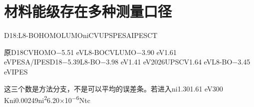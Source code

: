 \section{{\cjkfont 材料能级存在多种测量口径}\allowbreak{}}\label{sec:37}
D18:L8-BO\allowbreak{}HOMO\allowbreak{}LUMO\allowbreak{}ni\allowbreak{}CV\allowbreak{}UPS\allowbreak{}PESA\allowbreak{}IPES\allowbreak{}CT\allowbreak{}
\par
{\cjkfont 原}\allowbreak{}D18\allowbreak{}CV\allowbreak{}HOMO−5.51 eV\allowbreak{}L8-BO\allowbreak{}CV\allowbreak{}LUMO−3.90 eV\allowbreak{}1.61 eV\allowbreak{}PESA/IPES\allowbreak{}D18−5.39\allowbreak{}L8-BO−3.98 eV\allowbreak{}1.41 eV\allowbreak{}2026\allowbreak{}UPS\allowbreak{}CV\allowbreak{}1.64 eV\allowbreak{}L8-BO\allowbreak{}−3.45 eV\allowbreak{}IPES\allowbreak{}
\par
{\cjkfont 这三个数是方法分支，不是可以平均的误差条。若进入}\allowbreak{}ni\allowbreak{}1.30\allowbreak{}1.61 eV\allowbreak{}300 K\allowbreak{}ni\allowbreak{}0.00249\allowbreak{}ni\textsuperscript{2}\allowbreak{}6.20\ensuremath{\times}10\textsuperscript{−6}\allowbreak{}Nt\allowbreak{}c\allowbreak{}
